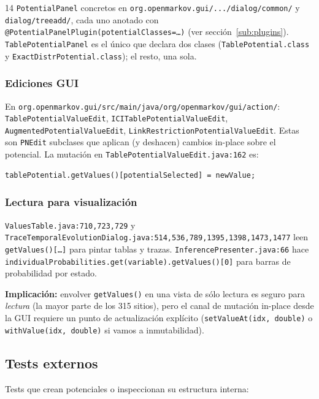 \documentclass[11pt,a4paper]{article}
\newcommand{\code}[1]{\texttt{#1}}
\newcommand{\warn}[1]{\textcolor{warnorange}{\textbf{#1}}}
\begin{document}
14 \code{PotentialPanel} concretos en \code{org.openmarkov.gui/.../dialog/common/}
y \code{dialog/treeadd/}, cada uno anotado con
\code{@PotentialPanelPlugin(potentialClasses=\dots)} (ver
sección~\ref{sub:plugins}). \code{TablePotentialPanel} es el único que
declara dos clases (\code{TablePotential.class} y
\code{ExactDistrPotential.class}); el resto, una sola.

\subsubsection*{Ediciones GUI}

En \code{org.openmarkov.gui/src/main/java/org/openmarkov/gui/action/}:
\code{TablePotentialValueEdit}, \code{ICITablePotentialValueEdit},
\code{AugmentedPotentialValueEdit}, \code{LinkRestrictionPotentialValueEdit}.
Estas son \code{PNEdit} subclases que aplican (y deshacen) cambios in-place
sobre el potencial. La mutación en
\code{TablePotentialValueEdit.java:162} es:

\begin{lstlisting}[caption={Mutación in-place vía \code{getValues()} en una edición.}]
tablePotential.getValues()[potentialSelected] = newValue;
\end{lstlisting}

\subsubsection*{Lectura para visualización}

\code{ValuesTable.java:710,723,729} y
\code{TraceTemporalEvolutionDialog.java:514,536,789,1395,1398,1473,1477}
leen \code{getValues()[\dots]} para pintar tablas y trazas.
\code{InferencePresenter.java:66} hace
\code{individualProbabilities.get(variable).getValues()[0]} para barras de
probabilidad por estado.

\warn{Implicación:} envolver \code{getValues()} en una vista de sólo lectura
es seguro para \emph{lectura} (la mayor parte de los 315 sitios), pero el
canal de mutación in-place desde la GUI requiere un punto de actualización
explícito (\code{setValueAt(idx, double)} o
\code{withValue(idx, double)} si vamos a inmutabilidad).

\subsection{Tests externos}

Tests que crean potenciales o inspeccionan su estructura interna:
\end{document}
